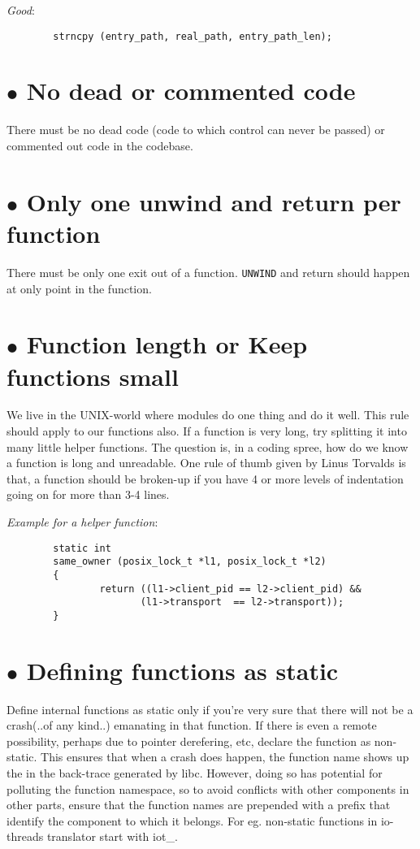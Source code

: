 \documentclass{article}[12pt]
\begin{document}
\textsl{Good}:

\begin{verbatim}
        strncpy (entry_path, real_path, entry_path_len);
\end{verbatim}

\section*{$\bullet$ No dead or commented code}
There must be no dead code (code to which control can never be passed) or 
commented out code in the codebase.

\section*{$\bullet$ Only one unwind and return per function}
There must be only one exit out of a function. \texttt{UNWIND} and return 
should happen at only point in the function.

\section*{$\bullet$ Function length or Keep functions small}
We live in the UNIX-world where modules do one thing and do it well.
This rule should apply to our functions also. If a function is very long, try splitting it
into many little helper functions. The question is, in a coding
spree, how do we know a function is long and unreadable. One rule of
thumb given by Linus Torvalds is that, a function should be broken-up
if you have 4 or more levels of indentation going on for more than 3-4
lines.

\vspace{2ex}
\textsl{Example for a helper function}:
\begin{verbatim}
        static int
        same_owner (posix_lock_t *l1, posix_lock_t *l2)
        {
                return ((l1->client_pid == l2->client_pid) &&
                       (l1->transport  == l2->transport));
        }
\end{verbatim}

\section*{$\bullet$ Defining functions as static}
Define internal functions as static only if you're
very sure that there will not be a crash(..of any kind..) emanating in
that function. If there is even a remote possibility, perhaps due to
pointer derefering, etc, declare the function as non-static. This
ensures that when a crash does happen, the function name shows up the
in the back-trace generated by libc. However, doing so has potential
for polluting the function namespace, so to avoid conflicts with other
components in other parts, ensure that the function names are
prepended with a prefix that identify the component to which it
belongs. For eg. non-static functions in io-threads translator start
with iot\_.
\end{document}
